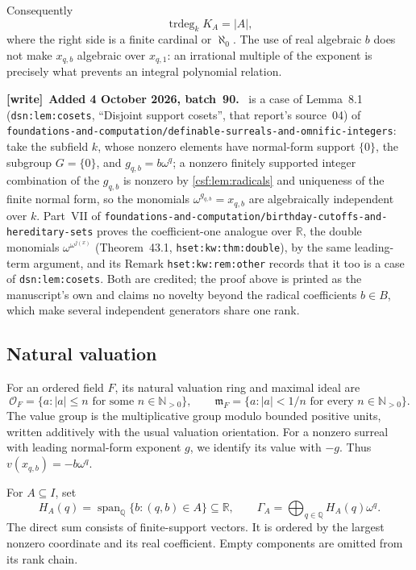 \documentclass[11pt,a4paper]{article}
\numberwithin{equation}{section}
\theoremstyle{definition}
\theoremstyle{remark}
\newcommand{\N}{\mathbb N}
\newcommand{\Q}{\mathbb Q}
\newcommand{\R}{\mathbb R}
\newcommand{\trdeg}{\operatorname{trdeg}}
\newcommand{\repo}[1]{\nolinkurl{#1}}
\newcommand{\lbl}[1]{\nolinkurl{#1}}
\newenvironment{writenote}[1][]{\par\smallskip\begingroup\small\raggedright
 \setlength{\parindent}{1.25em}\noindent\textbf{[write]}\if\relax\detokenize{#1}\relax\else~\textbf{#1.}\fi\ }%
 {\par\endgroup\smallskip}
\begin{document}
Consequently
\begin{equation}
 \trdeg_k K_A=|A|,
 \label{csf:eq:trdeg}
\end{equation}
where the right side is a finite cardinal or $\aleph_0$. The use of real
algebraic $b$ does not make $x_{q,b}$ algebraic over $x_{q,1}$: an irrational
multiple of the exponent is precisely what prevents an integral polynomial
relation.

\begin{writenote}[Added 4 October 2026, batch~90]
 is a case of Lemma~8.1 (\lbl{dsn:lem:cosets}, ``Disjoint support cosets'', that report's source~04) of \repo{foundations-and-computation/definable-surreals-and-omnific-integers}: take the subfield $k$, whose nonzero elements have normal-form support $\{0\}$, the subgroup $G=\{0\}$, and $g_{q,b}=b\omega^q$; a nonzero finitely supported integer combination of the $g_{q,b}$ is nonzero by \cref{csf:lem:radicals} and uniqueness of the finite normal form, so the monomials $\omega^{g_{q,b}}=x_{q,b}$ are algebraically independent over $k$. Part~VII of \repo{foundations-and-computation/birthday-cutoffs-and-hereditary-sets} proves the coefficient-one analogue over $\R$, the double monomials $\omega^{\omega^{j(x)}}$ (Theorem~43.1, \lbl{hset:kw:thm:double}), by the same leading-term argument, and its Remark \lbl{hset:kw:rem:other} records that it too is a case of \lbl{dsn:lem:cosets}. Both are credited; the proof above is printed as the manuscript's own and claims no novelty beyond the radical coefficients $b\in B$, which make several independent generators share one rank.
\end{writenote}

\subsection{Natural valuation}

For an ordered field $F$, its natural valuation ring and maximal ideal are
\[
 \mathcal O_F=\{a:|a|\le n\text{ for some }n\in\N_{>0}\},\qquad
 \mathfrak m_F=\{a:|a|<1/n\text{ for every }n\in\N_{>0}\}.
\]
The value group is the multiplicative group modulo bounded positive units,
written additively with the usual valuation orientation. For a nonzero
surreal with leading normal-form exponent $g$, we identify its value with
$-g$. Thus $v(x_{q,b})=-b\omega^q$.

For $A\subseteq I$, set
\begin{equation}
 H_A(q)=\operatorname{span}_{\Q}\{b:(q,b)\in A\}\subseteq\R,
 \qquad
 \Gamma_A=\bigoplus_{q\in\Q}H_A(q)\omega^q.
 \label{csf:eq:value-group}
\end{equation}
The direct sum consists of finite-support vectors. It is ordered by the
largest nonzero coordinate and its real coefficient. Empty components are
omitted from its rank chain.
\end{document}
